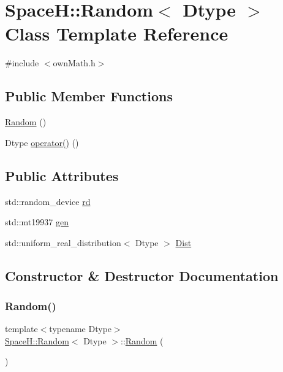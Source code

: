 \hypertarget{class_space_h_1_1_random}{}\section{SpaceH\+:\+:Random$<$ Dtype $>$ Class Template Reference}
\label{class_space_h_1_1_random}


{\ttfamily \#include $<$own\+Math.\+h$>$}

\subsection*{Public Member Functions}
\begin{DoxyCompactItemize}
\item 
\mbox{\hyperlink{class_space_h_1_1_random_a313024370bcb157bf72c56d0f6e8f2d5}{Random}} ()
\item 
Dtype \mbox{\hyperlink{class_space_h_1_1_random_a12e686912fc85070505209f69d006c51}{operator()}} ()
\end{DoxyCompactItemize}
\subsection*{Public Attributes}
\begin{DoxyCompactItemize}
\item 
std\+::random\+\_\+device \mbox{\hyperlink{class_space_h_1_1_random_a2d705e3238648654f3e675ad77c00943}{rd}}
\item 
std\+::mt19937 \mbox{\hyperlink{class_space_h_1_1_random_aeff0adf149520c41dd78f602d5c0820f}{gen}}
\item 
std\+::uniform\+\_\+real\+\_\+distribution$<$ Dtype $>$ \mbox{\hyperlink{class_space_h_1_1_random_a521984ba642735af9e3251b292cb7863}{Dist}}
\end{DoxyCompactItemize}


\subsection{Constructor \& Destructor Documentation}
\mbox{\label{class_space_h_1_1_random_a313024370bcb157bf72c56d0f6e8f2d5}} 
\subsubsection{\texorpdfstring{Random()}{Random()}}
{\footnotesize\ttfamily template$<$typename Dtype$>$ \\
\mbox{\hyperlink{class_space_h_1_1_random}{Space\+H\+::\+Random}}$<$ Dtype $>$\+::\mbox{\hyperlink{class_space_h_1_1_random}{Random}} (\begin{DoxyParamCaption}{ }\end{DoxyParamCaption})\hspace{0.3cm}{\ttfamily [inline]}}



